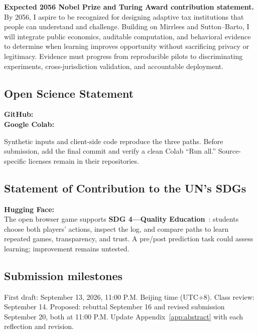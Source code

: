 \noindent\textbf{Expected 2056 Nobel Prize and Turing Award contribution statement.}
By 2056, I aspire to be recognized for designing adaptive tax institutions that people can understand and challenge. Building on Mirrlees and Sutton--Barto, I will integrate public economics, auditable computation, and behavioral evidence to determine when learning improves opportunity without sacrificing privacy or legitimacy. Evidence must progress from reproducible pilots to discriminating experiments, cross-jurisdiction validation, and accountable deployment.

\subsection*{Open Science Statement}
\textbf{GitHub:} \GitHubLink\\
\textbf{Google Colab:} \ColabLink\par
Synthetic inputs and client-side code reproduce the three paths. Before submission, add the final commit and verify a clean Colab ``Run all.'' Source-specific licenses remain in their repositories.

\subsection*{Statement of Contribution to the UN's SDGs}
\textbf{Hugging Face:} \DemoLink\\
The open browser game supports \textbf{SDG 4---Quality Education}~\cite{sdg4}: students choose both players' actions, inspect the log, and compare paths to learn repeated games, transparency, and trust. A pre/post prediction task could assess learning; improvement remains untested.

\subsection*{Submission milestones}
First draft: September 13, 2026, 11:00 P.M. Beijing time (UTC+8). Class review: September 14. Proposed: rebuttal September 16 and revised submission September 20, both at 11:00 P.M. Update Appendix~\ref{app:abstract} with each reflection and revision.
